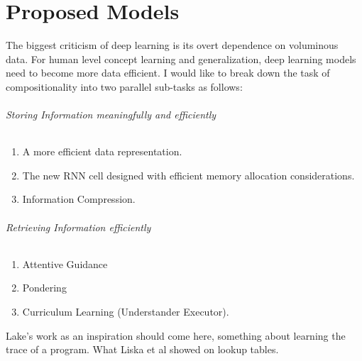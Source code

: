 \chapter{Proposed Models}\label{Chapter:proposals}

The biggest criticism of deep learning is its overt dependence on voluminous data. For human level concept learning and generalization, deep learning models need to become more data efficient. I would like to break down the task of compositionality into two parallel sub-tasks as follows:
\subparagraph{Storing Information meaningfully and efficiently}
\begin{enumerate}
	\item A more efficient data representation.
	\item The new RNN cell designed with efficient memory allocation considerations.
	\item Information Compression.		
\end{enumerate}
\subparagraph{Retrieving Information efficiently}
\begin{enumerate}
	\item Attentive Guidance	
	\item Pondering
	\item Curriculum Learning (Understander Executor).
\end{enumerate}

Lake's work as an inspiration should come here, something about learning the trace of a program. What Liska et al showed on lookup tables.